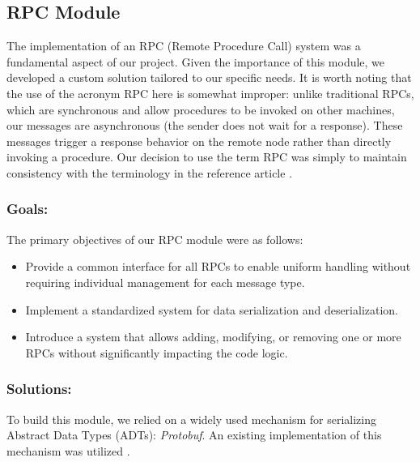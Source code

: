 \subsection{RPC Module} \label{RPCmodule}
The implementation of an RPC (Remote Procedure Call) system was a fundamental aspect of our project. 
Given the importance of this module, we developed a custom solution tailored to our specific needs. 
It is worth noting that the use of the acronym RPC here is somewhat improper: unlike traditional RPCs, 
which are synchronous and allow procedures to be invoked on other machines, our messages are 
asynchronous (the sender does not wait for a response). These messages trigger a response behavior 
on the remote node rather than directly invoking a procedure. Our decision to use the term RPC 
was simply to maintain consistency with the terminology in the reference article \cite{1}.

\subsubsection{Goals:\\}
The primary objectives of our RPC module were as follows:
\begin{itemize}
	\item Provide a common interface for all RPCs to enable uniform handling without requiring individual management for each message type.
	\item Implement a standardized system for data serialization and deserialization.
	\item Introduce a system that allows adding, modifying, or removing one or more RPCs without significantly impacting the code logic.
\end{itemize}

\subsubsection{Solutions:\\}
To build this module, we relied on a widely used mechanism for serializing Abstract Data Types 
(ADTs): \textit{Protobuf}. An existing implementation of this mechanism was utilized \cite{3}.

